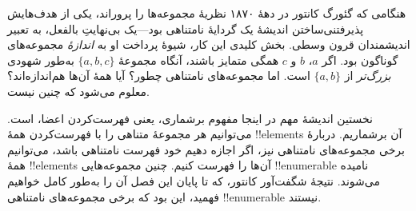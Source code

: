 \documentclass[../../../include/open-logic-section]{subfiles}
\begin{document}


هنگامی که گئورگ کانتور در دههٔ ۱۸۷۰ نظریهٔ مجموعه‌ها را پروراند، یکی
از هدف‌هایش پذیرفتنی‌ساختن اندیشهٔ یک گردایهٔ نامتناهی بود---یک بی‌نهایتِ
بالفعل، به تعبیر اندیشمندان قرون وسطی. بخش کلیدی این کار، شیوهٔ پرداخت
او به \emph{اندازهٔ} مجموعه‌های گوناگون بود. اگر $a$، $b$ و $c$
همگی متمایز باشند، آنگاه مجموعهٔ $\{a, b, c\}$ به‌طور شهودی
\emph{بزرگ‌تر} از $\{a, b\}$ است. اما مجموعه‌های نامتناهی چطور؟ آیا
همهٔ آن‌ها هم‌اندازه‌اند؟ معلوم می‌شود که چنین نیست.

نخستین اندیشهٔ مهم در اینجا مفهوم برشماری، یعنی فهرست‌کردن اعضا، است. می‌توانیم هر مجموعهٔ
متناهی را با فهرست‌کردن همهٔ !!{element}s آن برشماریم. دربارهٔ برخی
مجموعه‌های نامتناهی نیز، اگر اجازه دهیم خود فهرست نامتناهی باشد،
می‌توانیم همهٔ !!{element}s آن‌ها را فهرست کنیم. چنین مجموعه‌هایی
!!{enumerable} نامیده می‌شوند. نتیجهٔ شگفت‌آور کانتور، که تا پایان این
فصل آن را به‌طور کامل خواهیم فهمید، این بود که برخی مجموعه‌های نامتناهی
!!{enumerable} نیستند.
\end{document}
